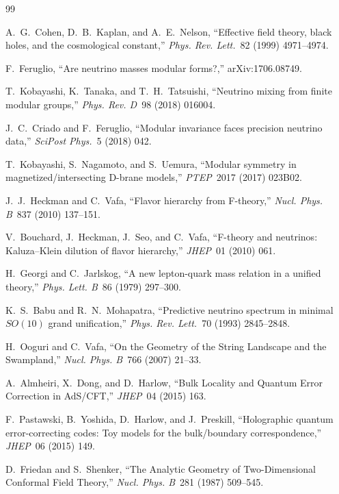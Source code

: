 \documentclass[11pt]{article}
\begin{document}
\begin{thebibliography}{99}

A.~G.~Cohen, D.~B.~Kaplan, and A.~E.~Nelson,
``Effective field theory, black holes, and the cosmological constant,''
\emph{Phys. Rev. Lett.}~82 (1999) 4971--4974.

F.~Feruglio,
``Are neutrino masses modular forms?,''
arXiv:1706.08749.

T.~Kobayashi, K.~Tanaka, and T.~H.~Tatsuishi,
``Neutrino mixing from finite modular groups,''
\emph{Phys. Rev. D}~98 (2018) 016004.

J.~C.~Criado and F.~Feruglio,
``Modular invariance faces precision neutrino data,''
\emph{SciPost Phys.}~5 (2018) 042.

T.~Kobayashi, S.~Nagamoto, and S.~Uemura,
``Modular symmetry in magnetized/intersecting D-brane models,''
\emph{PTEP}~2017 (2017) 023B02.

J.~J.~Heckman and C.~Vafa,
``Flavor hierarchy from F-theory,''
\emph{Nucl. Phys. B}~837 (2010) 137--151.

V.~Bouchard, J.~Heckman, J.~Seo, and C.~Vafa,
``F-theory and neutrinos: Kaluza--Klein dilution of flavor hierarchy,''
\emph{JHEP}~01 (2010) 061.

H.~Georgi and C.~Jarlskog,
``A new lepton-quark mass relation in a unified theory,''
\emph{Phys. Lett. B}~86 (1979) 297--300.

K.~S.~Babu and R.~N.~Mohapatra,
``Predictive neutrino spectrum in minimal $SO(10)$ grand unification,''
\emph{Phys. Rev. Lett.}~70 (1993) 2845--2848.

H.~Ooguri and C.~Vafa,
``On the Geometry of the String Landscape and the Swampland,''
\emph{Nucl. Phys. B}~766 (2007) 21--33.

A.~Almheiri, X.~Dong, and D.~Harlow,
``Bulk Locality and Quantum Error Correction in AdS/CFT,''
\emph{JHEP}~04 (2015) 163.

F.~Pastawski, B.~Yoshida, D.~Harlow, and J.~Preskill,
``Holographic quantum error-correcting codes: Toy models for the bulk/boundary correspondence,''
\emph{JHEP}~06 (2015) 149.

D.~Friedan and S.~Shenker,
``The Analytic Geometry of Two-Dimensional Conformal Field Theory,''
\emph{Nucl. Phys. B}~281 (1987) 509--545.


\end{thebibliography}
\end{document}
